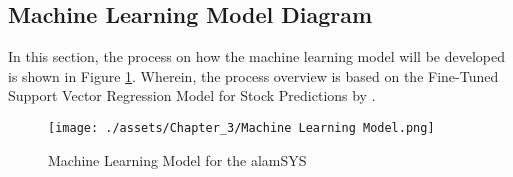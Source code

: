 \subsection{Machine Learning Model Diagram}
\label{subsec:ml_diagram}
In this section, the process on how the machine learning model 
will be developed is shown in Figure \ref{fig:ml_model}. 
Wherein, the process overview is based on the Fine-Tuned Support 
Vector Regression Model for Stock Predictions by 
.
\begin{figure}[ht]
    \centering
    \texttt{[image: ./assets/Chapter\_3/Machine Learning Model.png]}
    \caption{Machine Learning Model for the alamSYS}
    \label{fig:ml_model}
\end{figure}
\FloatBarrier